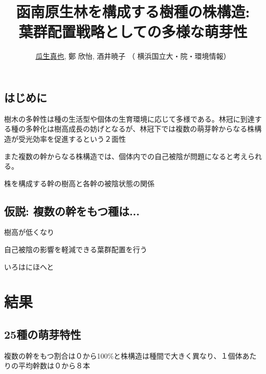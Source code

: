 \documentclass[a0, 36pt, plainboxedsections]{sciposter} %
\title{函南原生林を構成する樹種の株構造:\\葉群配置戦略としての多様な萌芽性}
\author{\Large{\faUser \hspace{0.02em} \underline{瓜生真也}, 鄭 欣怡, 酒井暁子 （\faUniv \hspace{0.02em} 横浜国立大・院・環境情報）}}
\begin{document}
\maketitle
\begin{multicols}{2}

\section*{\huge{はじめに}}

樹木の多幹性は種の生活型や個体の生育環境に応じて多様である。林冠に到達する種の多幹化は樹高成長の妨げとなるが、林冠下では複数の萌芽幹からなる株構造が受光効率を促進するという２面性

また複数の幹からなる株構造では、個体内での自己被陰が問題になると考えられる。

株を構成する幹の樹高と各幹の被陰状態の関係

\subsection*{仮説: 複数の幹をもつ種は...}

\begin{list}{}{\setlength{\itemindent}{1em}} %
 \item 樹高が低くなり
 \item 自己被陰の影響を軽減できる葉群配置を行う
\end{list}

\begin{mdframed}[roundcorner=5pt, align=left, backgroundcolor=Orange1]
  \centering\huge{\color{white}{まとめ}}
  
  \flushleft\normalsize{いろはにほへと}
\end{mdframed}



\end{multicols}

\section*{\huge{結果}}

\subsection*{25種の萌芽特性}

複数の幹をもつ割合は０から100\%と株構造は種間で大きく異なり、１個体あたりの平均幹数は０から８本
\end{document}
